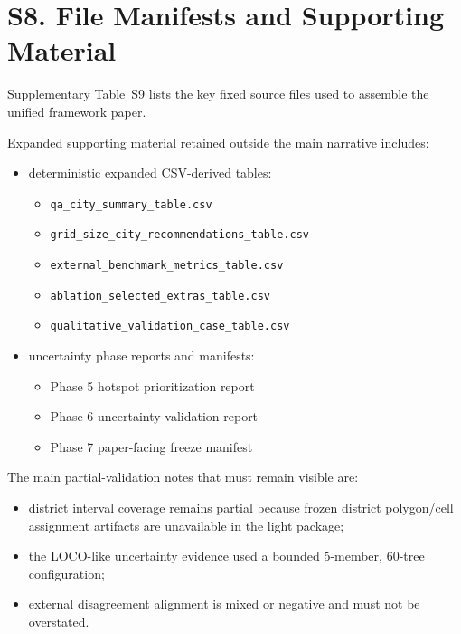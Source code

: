 \section{S8. File Manifests and Supporting Material}

Supplementary Table~S9 lists the key fixed source files used to assemble the unified framework paper.



Expanded supporting material retained outside the main narrative includes:

\begin{itemize}
\item deterministic expanded CSV-derived tables:
  \begin{itemize}
  \item \texttt{qa\_city\_summary\_table.csv}
  \item \texttt{grid\_size\_city\_recommendations\_table.csv}
  \item \texttt{external\_benchmark\_metrics\_table.csv}
  \item \texttt{ablation\_selected\_extras\_table.csv}
  \item \texttt{qualitative\_validation\_case\_table.csv}
  \end{itemize}
\item uncertainty phase reports and manifests:
  \begin{itemize}
  \item Phase 5 hotspot prioritization report
  \item Phase 6 uncertainty validation report
  \item Phase 7 paper-facing freeze manifest
  \end{itemize}
\end{itemize}

The main partial-validation notes that must remain visible are:

\begin{itemize}
\item district interval coverage remains partial because frozen district polygon/cell assignment artifacts are unavailable in the light package;
\item the LOCO-like uncertainty evidence used a bounded 5-member, 60-tree configuration;
\item external disagreement alignment is mixed or negative and must not be overstated.
\end{itemize}

